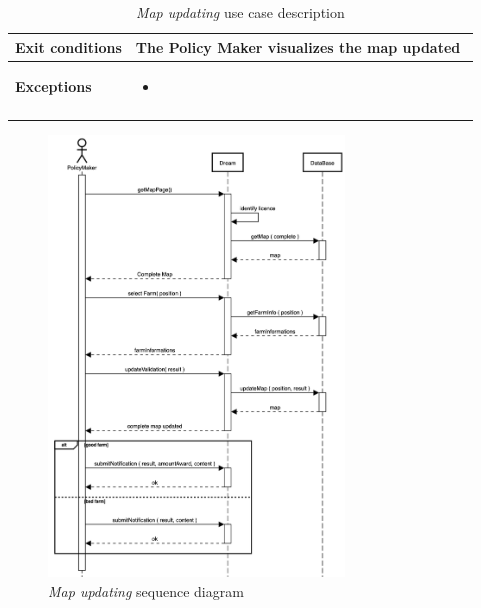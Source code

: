 \begin{enumerate}
\begin{longtable}{p{0.26\linewidth}p{0.75\linewidth}}
        \midrule
        \textbf{Exit conditions} & The Policy Maker visualizes the map updated\\
        \midrule
        \textbf{Exceptions} & 
        \begin{itemize}
            \item 
        \end{itemize}\\
        \bottomrule
        \caption{\emph{Map updating} use case description}
    \end{longtable}
    \begin{figure}[H]
        \begin{center}
        \includegraphics[width=0.7\textwidth]{sequence/updateMap.png}
        \caption{\emph{Map updating} sequence diagram}
        \label{fig:sequence12}
        \end{center}
    \end{figure}


\end{enumerate}

